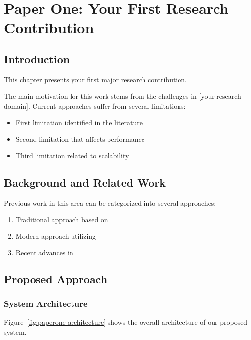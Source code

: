 \chapter{Paper One: Your First Research Contribution}
\label{chapter:paperone}

\section{Introduction}

This chapter presents your first major research contribution. \lipsum[1-2]

The main motivation for this work stems from the challenges in [your research domain]. Current approaches suffer from several limitations:
\begin{itemize}
    \item First limitation identified in the literature
    \item Second limitation that affects performance
    \item Third limitation related to scalability
\end{itemize}

\section{Background and Related Work}

\lipsum[3-4]

Previous work in this area can be categorized into several approaches:
\begin{enumerate}
    \item Traditional approach based on \cite{example-reference-1}
    \item Modern approach utilizing \cite{example-reference-2} 
    \item Recent advances in \cite{example-reference-3}
\end{enumerate}

\section{Proposed Approach}

\subsection{System Architecture}

Figure~\ref{fig:paperone-architecture} shows the overall architecture of our proposed system.

